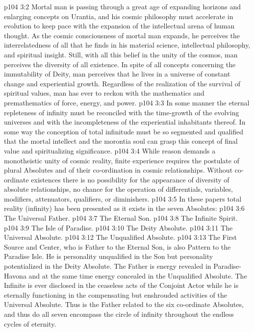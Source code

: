 \vs p104 3:2 Mortal man is passing through a great age of expanding horizons and enlarging concepts on Urantia, and his cosmic philosophy must accelerate in evolution to keep pace with the expansion of the intellectual arena of human thought. As the cosmic consciousness of mortal man expands, he perceives the interrelatedness of all that he finds in his material science, intellectual philosophy, and spiritual insight. Still, with all this belief in the unity of the cosmos, man perceives the diversity of all existence. In spite of all concepts concerning the immutability of Deity, man perceives that he lives in a universe of constant change and experiential growth. Regardless of the realization of the survival of spiritual values, man has ever to reckon with the mathematics and premathematics of force, energy, and power.
\vs p104 3:3 In some manner the eternal repleteness of infinity must be reconciled with the time\hyp{}growth of the evolving universes and with the incompleteness of the experiential inhabitants thereof. In some way the conception of total infinitude must be so segmented and qualified that the mortal intellect and the morontia soul can grasp this concept of final value and spiritualizing significance.
\vs p104 3:4 While reason demands a monotheistic unity of cosmic reality, finite experience requires the postulate of plural Absolutes and of their co\hyp{}ordination in cosmic relationships. Without co\hyp{}ordinate existences there is no possibility for the appearance of diversity of absolute relationships, no chance for the operation of differentials, variables, modifiers, attenuators, qualifiers, or diminishers.
\pc \vs p104 3:5 In these papers total reality (infinity) has been presented as it exists in the seven Absolutes:
\pc \vs p104 3:6 \bibnobreakspace The Universal Father.
\vs p104 3:7 \bibnobreakspace The Eternal Son.
\vs p104 3:8 \bibnobreakspace The Infinite Spirit.
\vs p104 3:9 \bibnobreakspace The Isle of Paradise.
\vs p104 3:10 \bibnobreakspace The Deity Absolute.
\vs p104 3:11 \bibnobreakspace The Universal Absolute.
\vs p104 3:12 \bibnobreakspace The Unqualified Absolute.
\pc \vs p104 3:13 The First Source and Center, who is Father to the Eternal Son, is also Pattern to the Paradise Isle. He is personality unqualified in the Son but personality potentialized in the Deity Absolute. The Father is energy revealed in Paradise\hyp{}Havona and at the same time energy concealed in the Unqualified Absolute. The Infinite is ever disclosed in the ceaseless acts of the Conjoint Actor while he is eternally functioning in the compensating but enshrouded activities of the Universal Absolute. Thus is the Father related to the six co\hyp{}ordinate Absolutes, and thus do all seven encompass the circle of infinity throughout the endless cycles of eternity.
